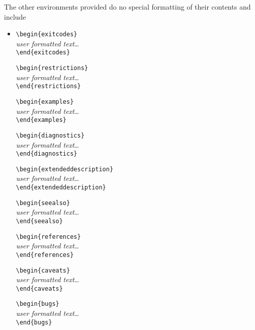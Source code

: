 The other environments provided do no special formatting of their
contents and include
 \begin{itemize}
    \item[]
          \verb|\begin{exitcodes}|\\
          {\it user formatted text}\ldots{}\\
          \verb|\end{exitcodes}|

          \verb|\begin{restrictions}|\\
          {\it user formatted text}\ldots{}\\
          \verb|\end{restrictions}|

          \verb|\begin{examples}|\\
          {\it user formatted text}\ldots{}\\
          \verb|\end{examples}|

          \verb|\begin{diagnostics}|\\
          {\it user formatted text}\ldots{}\\
          \verb|\end{diagnostics}|

          \verb|\begin{extendeddescription}|\\
          {\it user formatted text}\ldots{}\\
          \verb|\end{extendeddescription}|

          \verb|\begin{seealso}|\\
          {\it user formatted text}\ldots{}\\
          \verb|\end{seealso}|

          \verb|\begin{references}|\\
          {\it user formatted text}\ldots{}\\
          \verb|\end{references}|

          \verb|\begin{caveats}|\\
          {\it user formatted text}\ldots{}\\
          \verb|\end{caveats}|

          \verb|\begin{bugs}|\\
          {\it user formatted text}\ldots{}\\
          \verb|\end{bugs}|
  \end{itemize}

